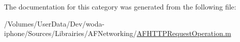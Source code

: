 The documentation for this category was generated from the following file\-:\begin{DoxyCompactItemize}
\item 
/\-Volumes/\-User\-Data/\-Dev/woda-\/iphone/\-Sources/\-Librairies/\-A\-F\-Networking/\hyperlink{_a_f_h_t_t_p_request_operation_8m}{A\-F\-H\-T\-T\-P\-Request\-Operation.\-m}\end{DoxyCompactItemize}

